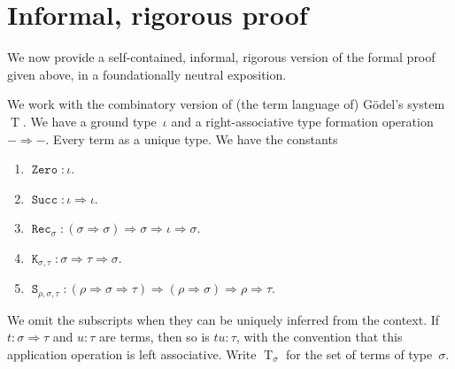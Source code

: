 \documentclass{entcs} \usepackage{prentcsmacro}
\begin{document}
\section{Informal, rigorous proof} \label{section:informal}

\newcommand{\decode}{\operatorname{decode}}
\newcommand{\generic}{\operatorname{generic}}
\newcommand{\T}{\operatorname{T}}
\newcommand{\D}{\operatorname{D}}
\newcommand{\B}{\operatorname{B}}
\newcommand{\To}{\Rightarrow}
\newcommand{\Zero}{\operatorname{\mathtt{Zero}}}
\newcommand{\Succ}{\operatorname{\mathtt{Succ}}}
\newcommand{\Rec}{\operatorname{\mathtt{Rec}}}
\newcommand{\K}{\operatorname{\mathtt{K}}}
\renewcommand{\SS}{\operatorname{\mathtt{S}}}
\newcommand{\interp}[1]{\llbracket #1 \rrbracket}
\newcommand{\binterp}[1]{{\scriptstyle \B}\llbracket #1 \rrbracket}
\newcommand{\N}{\mathbb{N}}

We now provide a self-contained, informal, rigorous version of the
formal proof given above, in a foundationally neutral exposition.

We work with the combinatory version of (the term language of)
G\"odel's system~$\T$. We have a ground type~$\iota$ and a right-associative
type formation operation $-\To-$. Every term as a unique type. We have
the constants \begin{enumerate} \item $\Zero \colon \iota$.  \item
$\Succ \colon \iota \To \iota$.  \item $\Rec_{\sigma} \colon (\sigma
\To \sigma) \To \sigma \To \iota \To \sigma$.  \item $\K_{\sigma,\tau}
\colon \sigma \To \tau \To \sigma$.  \item $\SS_{\rho,\sigma,\tau}
\colon (\rho \To \sigma \To \tau) \To (\rho \To \sigma) \To \rho \To
\tau$.  \end{enumerate} We omit the subscripts when they can be
uniquely inferred from the context.  If $t \colon \sigma \To \tau$ and
$u \colon \tau$ are terms, then so is $tu \colon \tau$, with the
convention that this application operation is left associative. 
Write $\T_\sigma$ for the set of terms of type~$\sigma$.
\end{document}
